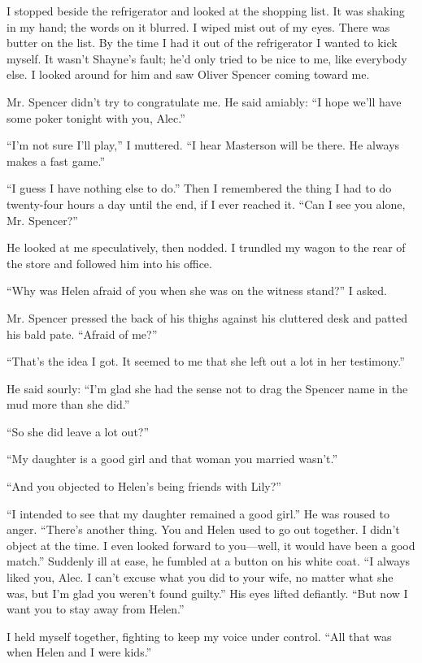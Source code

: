 \documentclass{novel}
\begin{document}
I stopped beside the refrigerator and looked at the shopping list. It was shaking in my hand; the words on it blurred. I wiped mist out of my eyes. There was butter on the list. By the time I had it out of the refrigerator I wanted to kick myself. It wasn’t Shayne’s fault; he’d only tried to be nice to me, like everybody else. I looked around for him and saw Oliver Spencer coming toward me.

Mr. Spencer didn’t try to congratulate me. He said amiably: “I hope we’ll have some poker tonight with you, Alec.”

“I’m not sure I’ll play,” I muttered. “I hear Masterson will be there. He always makes a fast game.”

“I guess I have nothing else to do.” Then I remembered the thing I had to do twenty-four hours a day until the end, if I ever reached it. “Can I see you alone, Mr. Spencer?”

He looked at me speculatively, then nodded. I trundled my wagon to the rear of the store and followed him into his office.

“Why was Helen afraid of you when she was on the witness stand?” I asked.

Mr. Spencer pressed the back of his thighs against his cluttered desk and patted his bald pate. “Afraid of me?”

“That’s the idea I got. It seemed to me that she left out a lot in her testimony.”

He said sourly: “I’m glad she had the sense not to drag the Spencer name in the mud more than she did.”

“So she did leave a lot out?”

“My daughter is a good girl and that woman you married wasn’t.”

“And you objected to Helen’s being friends with Lily?”

“I intended to see that my daughter remained a good girl.” He was roused to anger. “There’s another thing. You and Helen used to go out together. I didn’t object at the time. I even looked forward to you—well, it would have been a good match.” Suddenly ill at ease, he fumbled at a button on his white coat. “I always liked you, Alec. I can’t excuse what you did to your wife, no matter what she was, but I’m glad you weren’t found guilty.” His eyes lifted defiantly. “But now I want you to stay away from Helen.”

I held myself together, fighting to keep my voice under control. “All that was when Helen and I were kids.”
\end{document}
